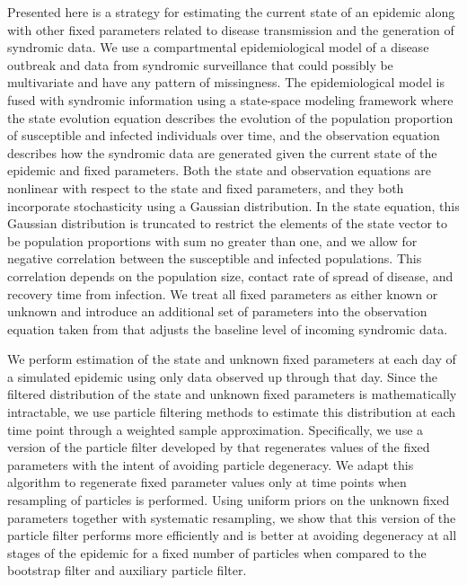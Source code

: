 
Presented here is a strategy for estimating the current state of an epidemic along with other fixed parameters related to disease transmission and the generation of syndromic data. We use a compartmental epidemiological model of a disease outbreak and data from syndromic surveillance that could possibly be multivariate and have any pattern of missingness. The epidemiological model is fused with syndromic information using a state-space modeling framework where the state evolution equation describes the evolution of the population proportion of susceptible and infected individuals over time, and the observation equation describes how the syndromic data are generated given the current state of the epidemic and fixed parameters. Both the state and observation equations are nonlinear with respect to the state and fixed parameters, and they both incorporate stochasticity using a Gaussian distribution. In the state equation, this Gaussian distribution is truncated to restrict the elements of the state vector to be population proportions with sum no greater than one, and we allow for negative correlation between the susceptible and infected populations. This correlation depends on the population size, contact rate of spread of disease, and recovery time from infection. We treat all fixed parameters as either known or unknown and introduce an additional set of parameters into the observation equation taken from \citet{skvortsov2012monitoring} that adjusts the baseline level of incoming syndromic data.

We perform estimation of the state and unknown fixed parameters at each day of a simulated epidemic using only data observed up through that day. Since the filtered distribution of the state and unknown fixed parameters is mathematically intractable, we use particle filtering methods to estimate this distribution at each time point through a weighted sample approximation. Specifically, we use a version of the particle filter developed by \citet{Liu:West:comb:2001} that regenerates values of the fixed parameters with the intent of avoiding particle degeneracy. We adapt this algorithm to regenerate fixed parameter values only at time points when resampling of particles is performed. Using uniform priors on the unknown fixed parameters together with systematic resampling, we show that this version of the particle filter performs more efficiently and is better at avoiding degeneracy at all stages of the epidemic for a fixed number of particles when compared to the bootstrap filter and auxiliary particle filter.

